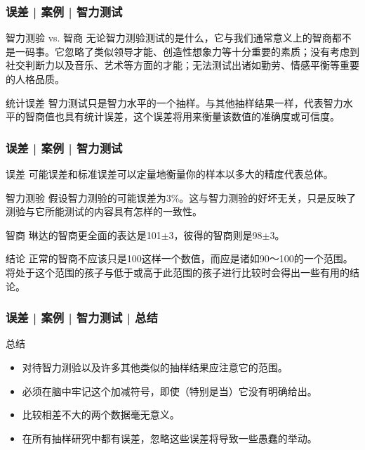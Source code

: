 \begin{frame}
  \frametitle{误差 | 案例 | 智力测试}
  \begin{block}{智力测验 vs. 智商}
    无论智力测验测试的是什么，它与我们通常意义上的智商都不是一码事。它忽略了类似领导才能、创造性想象力等十分重要的素质；没有考虑到社交判断力以及音乐、艺术等方面的才能；无法测试出诸如勤劳、情感平衡等重要的人格品质。
  \end{block}
  \pause
  \begin{block}{统计误差}
    智力测试只是智力水平的一个抽样。与其他抽样结果一样，代表智力水平的智商值也具有统计误差，这个误差将用来衡量该数值的准确度或可信度。
  \end{block}
\end{frame}

\begin{frame}
  \frametitle{误差 | 案例 | 智力测试}
  \begin{block}{误差}
    可能误差和标准误差可以定量地衡量你的样本以多大的精度代表总体。
  \end{block}
  \pause
  \begin{block}{智力测验}
    假设智力测验的可能误差为3\%。这与智力测验的好坏无关，只是反映了测验与它所能测试的内容具有怎样的一致性。
  \end{block}
  \pause
  \begin{block}{智商}
    琳达的智商更全面的表达是101$\pm$3，彼得的智商则是98$\pm$3。
  \end{block}
  \pause
  \begin{block}{结论}
    正常的智商不应该只是100这样一个数值，而应是诸如90～100的一个范围。将处于这个范围的孩子与低于或高于此范围的孩子进行比较时会得出一些有用的结论。
  \end{block}
\end{frame}

\begin{frame}
  \frametitle{误差 | 案例 | 智力测试 | 总结}
  \begin{block}{总结}
    \begin{itemize}
      \item 对待智力测验以及许多其他类似的抽样结果应注意它的范围。
      \item 必须在脑中牢记这个加减符号，即使（特别是当）它没有明确给出。
      \item 比较相差不大的两个数据毫无意义。
      \item 在所有抽样研究中都有误差，忽略这些误差将导致一些愚蠢的举动。
    \end{itemize}
  \end{block}
\end{frame}

